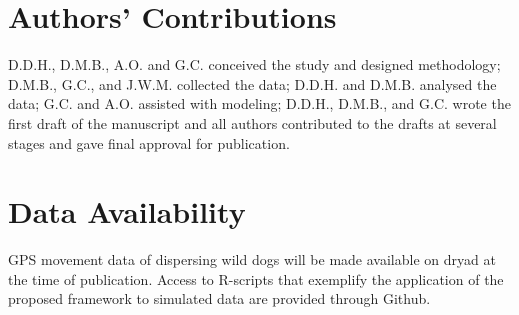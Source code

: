 \documentclass[abstract=on,10pt,a4paper,bibliography=totocnumbered]{article}
\begin{document}


\section{Authors' Contributions}
D.D.H., D.M.B., A.O. and G.C. conceived the study and designed methodology;
D.M.B., G.C., and J.W.M. collected the data; D.D.H. and D.M.B. analysed the
data; G.C. and A.O. assisted with modeling; D.D.H., D.M.B., and G.C. wrote the
first draft of the manuscript and all authors contributed to the drafts at
several stages and gave final approval for publication.

\section{Data Availability}
GPS movement data of dispersing wild dogs will be made available on dryad at the
time of publication. Access to R-scripts that exemplify the application of the
proposed framework to simulated data are provided through Github.
\end{document}
